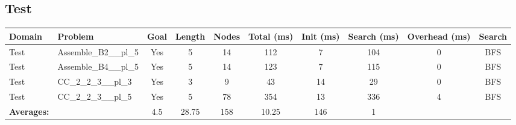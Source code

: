 \documentclass{article}
\begin{document}
\subsection*{Test}
\begin{tabular}{llcccccccc}
\toprule
Domain & Problem & Goal & Length & Nodes & Total (ms) & Init (ms) & Search (ms) & Overhead (ms) & Search \\
\midrule
Test & Assemble\_B2\_\_pl\_5 & Yes & 5 & 14 & 112 & 7 & 104 & 0 & BFS \\
Test & Assemble\_B4\_\_pl\_5 & Yes & 5 & 14 & 123 & 7 & 115 & 0 & BFS \\
Test & CC\_2\_2\_3\_\_pl\_3 & Yes & 3 & 9 & 43 & 14 & 29 & 0 & BFS \\
Test & CC\_2\_2\_3\_\_pl\_5 & Yes & 5 & 78 & 354 & 13 & 336 & 4 & BFS \\
\textbf{Averages:} & & 4.5 & 28.75 & 158 & 10.25 & 146 & 1 & \\
\bottomrule
\end{tabular}
\\[0.7cm]
\newpage
\end{document}
